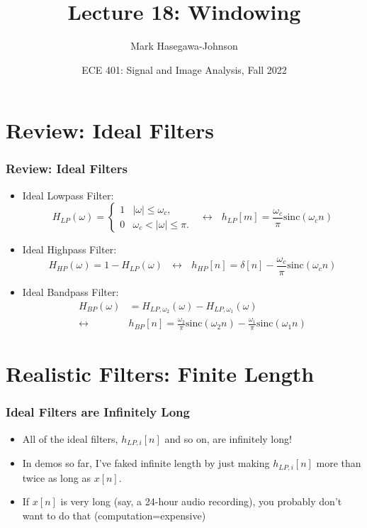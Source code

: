 \documentclass{beamer}
\title{Lecture 18: Windowing}
\author{Mark Hasegawa-Johnson}
\date{ECE 401: Signal and Image Analysis, Fall 2022}
\begin{document}
\begin{frame}
  \maketitle
\end{frame}

\begin{frame}
  \tableofcontents
\end{frame}

\section[Review]{Review: Ideal Filters}
\setcounter{subsection}{1}

\begin{frame}
  \frametitle{Review: Ideal Filters}
  \begin{itemize}
  \item Ideal Lowpass Filter:
    \[
    H_{LP}(\omega)
    = \begin{cases} 1& |\omega|\le\omega_c,\\
      0 & \omega_c<|\omega|\le\pi.
    \end{cases}~~~\leftrightarrow~~~
    h_{LP}[m]=\frac{\omega_c}{\pi}\mbox{sinc}(\omega_c n)
    \]
  \item Ideal Highpass Filter:
    \[
    H_{HP}(\omega)=1-H_{LP}(\omega)~~~\leftrightarrow~~~
    h_{HP}[n]=\delta[n]-\frac{\omega_c}{\pi}\mbox{sinc}(\omega_c n)
    \]
  \item Ideal Bandpass Filter:
    \begin{align*}
      H_{BP}(\omega)&=H_{LP,\omega_2}(\omega)-H_{LP,\omega_1}(\omega)\\
      \leftrightarrow
      &h_{BP}[n]=\frac{\omega_2}{\pi}\mbox{sinc}(\omega_2 n)-\frac{\omega_1}{\pi}\mbox{sinc}(\omega_1 n)
    \end{align*}
  \end{itemize}
\end{frame}


\section[Finite-Length]{Realistic Filters: Finite Length}
\setcounter{subsection}{1}

\begin{frame}
  \frametitle{Ideal Filters are Infinitely Long}
  
  \begin{itemize}
  \item All of the ideal filters, $h_{LP,i}[n]$ and so on, are infinitely
    long!
  \item In demos so far, I've faked infinite length by just making
    $h_{LP,i}[n]$ more than twice as long as $x[n]$.
  \item If $x[n]$ is very long (say, a 24-hour audio recording), you
    probably don't want to do that (computation=expensive)
  \end{itemize}
\end{frame}
\end{document}
